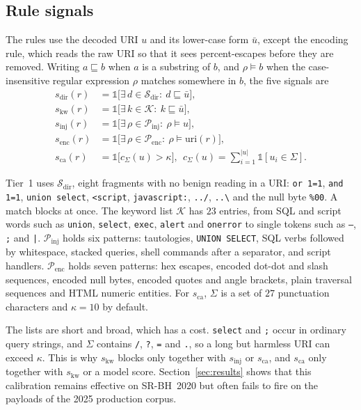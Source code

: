 \documentclass[preprint,11pt]{elsarticle}
\begin{document}
\subsection{Rule signals}
\label{sec:rules}
The rules use the decoded URI $u$ and its lower-case form $\bar u$, except
the encoding rule, which reads the raw URI so that it sees percent-escapes
before they are removed. Writing $a\sqsubseteq b$ when $a$ is a substring of
$b$, and $\rho\models b$ when the case-insensitive regular expression $\rho$
matches somewhere in $b$, the five signals are
\begin{align}
s_{\text{dir}}(r) &= \mathbb{1}\bigl[\exists\, d\in\mathcal{S}_{\text{dir}}:\ d\sqsubseteq \bar u\bigr], \label{eq:sdir}\\
s_{\text{kw}}(r) &= \mathbb{1}\bigl[\exists\, k\in\mathcal{K}:\ k\sqsubseteq \bar u\bigr], \label{eq:skw}\\
s_{\text{inj}}(r) &= \mathbb{1}\bigl[\exists\, \rho\in\mathcal{P}_{\text{inj}}:\ \rho\models u\bigr], \label{eq:sinj}\\
s_{\text{enc}}(r) &= \mathbb{1}\bigl[\exists\, \rho\in\mathcal{P}_{\text{enc}}:\ \rho\models \mathrm{uri}(r)\bigr], \label{eq:senc}\\
s_{\text{ca}}(r) &= \mathbb{1}\bigl[c_\Sigma(u)>\kappa\bigr],\ \
c_\Sigma(u)=\textstyle\sum_{i=1}^{|u|}\mathbb{1}[u_i\in\Sigma]. \label{eq:sca}
\end{align}

Tier~1 uses $\mathcal{S}_{\text{dir}}$, eight fragments with no benign
reading in a URI: \texttt{or 1=1}, \texttt{and 1=1}, \texttt{union select},
\texttt{<script}, \texttt{javascript:}, \texttt{../}, \texttt{..\textbackslash}
and the null byte \texttt{\%00}. A match blocks at once. The keyword list
$\mathcal{K}$ has $23$ entries, from SQL and script words such as
\texttt{union}, \texttt{select}, \texttt{exec}, \texttt{alert} and
\texttt{onerror} to single tokens such as \texttt{--}, \texttt{;} and
\texttt{|}. $\mathcal{P}_{\text{inj}}$ holds six patterns: tautologies,
\texttt{UNION SELECT}, SQL verbs followed by whitespace, stacked queries,
shell commands after a separator, and script handlers.
$\mathcal{P}_{\text{enc}}$ holds seven patterns: hex escapes, encoded
dot-dot and slash sequences, encoded null bytes, encoded quotes and angle
brackets, plain traversal sequences and HTML numeric entities. For
$s_{\text{ca}}$, $\Sigma$ is a set of $27$ punctuation characters and
$\kappa=10$ by default.

The lists are short and broad, which has a cost. \texttt{select} and
\texttt{;} occur in ordinary query strings, and $\Sigma$ contains
\texttt{/}, \texttt{?}, \texttt{=} and \texttt{.}, so a long but harmless
URI can exceed $\kappa$. This is why $s_{\text{kw}}$ blocks only together
with $s_{\text{inj}}$ or $s_{\text{ca}}$, and $s_{\text{ca}}$ only together
with $s_{\text{kw}}$ or a model score. Section~\ref{sec:results} shows that
this calibration remains effective on SR-BH~2020 but often fails to fire on
the payloads of the 2025 production corpus.
\end{document}
